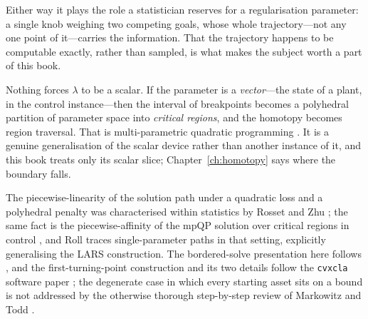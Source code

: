 Either way it plays the role a statistician reserves for a regularisation
parameter: a single knob weighing two competing goals, whose whole trajectory---not
any one point of it---carries the information. That the trajectory happens to be
computable exactly, rather than sampled, is what makes the subject worth a part of
this book.

\begin{remark}
\label{rem:vector}
Nothing forces $\lambda$ to be a scalar. If the parameter is a \emph{vector}---the
state of a plant, in the control instance---then the interval of breakpoints becomes
a polyhedral partition of parameter space into \emph{critical regions}, and the
homotopy becomes region traversal. That is multi-parametric quadratic programming
\cite{bemporad2002,tondel2003}. It is a genuine generalisation of the scalar device
rather than another instance of it, and this book treats only its scalar slice;
Chapter~\ref{ch:homotopy} says where the boundary falls.
\end{remark}

\begin{notes}
The piecewise-linearity of the solution path under a quadratic loss and a polyhedral
penalty was characterised within statistics by Rosset and Zhu \cite{rosset2007}; the
same fact is the piecewise-affinity of the mpQP solution over critical regions in
control \cite{bemporad2002}, and Roll \cite{roll2008} traces single-parameter paths
in that setting, explicitly generalising the LARS construction. The bordered-solve
presentation here follows \cite{schmelzer2026perspective}, and the first-turning-point
construction and its two details follow the \texttt{cvxcla} software paper
\cite{cvxcla}; the degenerate case in which every starting asset sits on a bound is
not addressed by the otherwise thorough step-by-step review of Markowitz and
Todd \cite{markowitz2021}.
\end{notes}

